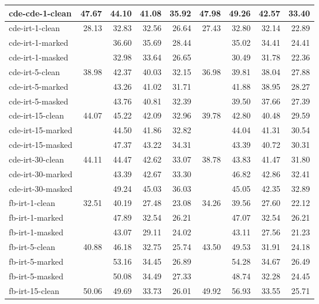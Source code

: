 \begin{tabular}{| l | r | r | r | r | r | r | r | r |}
    cde-cde-1-clean    & 47.67 & 44.10 & 41.08 & 35.92 & 47.98 & 49.26 & 42.57 & 33.40 \\ \hline
    cde-irt-1-clean    & 28.13 & 32.83 & 32.56 & 26.64 & 27.43 & 32.80 & 32.14 & 22.89 \\
    cde-irt-1-marked   &       & 36.60 & 35.69 & 28.44 &       & 35.02 & 34.41 & 24.41 \\
    cde-irt-1-masked   &       & 32.98 & 33.64 & 26.65 &       & 30.49 & 31.78 & 22.36 \\ \hline
    cde-irt-5-clean    & 38.98 & 42.37 & 40.03 & 32.15 & 36.98 & 39.81 & 38.04 & 27.88 \\
    cde-irt-5-marked   &       & 43.26 & 41.02 & 31.71 &       & 41.88 & 38.95 & 28.27 \\
    cde-irt-5-masked   &       & 43.76 & 40.81 & 32.39 &       & 39.50 & 37.66 & 27.39 \\ \hline
    cde-irt-15-clean   & 44.07 & 45.22 & 42.09 & 32.96 & 39.78 & 42.80 & 40.48 & 29.59 \\
    cde-irt-15-marked  &       & 44.50 & 41.86 & 32.82 &       & 44.04 & 41.31 & 30.54 \\
    cde-irt-15-masked  &       & 47.37 & 43.22 & 34.31 &       & 43.39 & 40.72 & 30.31 \\ \hline
    cde-irt-30-clean   & 44.11 & 44.47 & 42.62 & 33.07 & 38.78 & 43.83 & 41.47 & 31.80 \\
    cde-irt-30-marked  &       & 43.39 & 42.67 & 33.30 &       & 46.82 & 42.86 & 32.41 \\
    cde-irt-30-masked  &       & 49.24 & 45.03 & 36.03 &       & 45.05 & 42.35 & 32.89 \\ \hline \hline
    fb-irt-1-clean     & 32.51 & 40.19 & 27.48 & 23.08 & 34.26 & 39.56 & 27.60 & 22.12 \\
    fb-irt-1-marked    &       & 47.89 & 32.54 & 26.21 &       & 47.07 & 32.54 & 26.21 \\
    fb-irt-1-masked    &       & 43.07 & 29.11 & 24.02 &       & 43.11 & 27.56 & 21.23 \\ \hline
    fb-irt-5-clean     & 40.88 & 46.18 & 32.75 & 25.74 & 43.50 & 49.53 & 31.91 & 24.18 \\
    fb-irt-5-marked    &       & 53.16 & 34.45 & 26.89 &       & 54.28 & 34.67 & 26.49 \\
    fb-irt-5-masked    &       & 50.08 & 34.49 & 27.33 &       & 48.74 & 32.28 & 24.45 \\ \hline
    fb-irt-15-clean    & 50.06 & 49.69 & 33.73 & 26.01 & 49.92 & 56.93 & 33.55 & 25.71 \\

\end{tabular}
